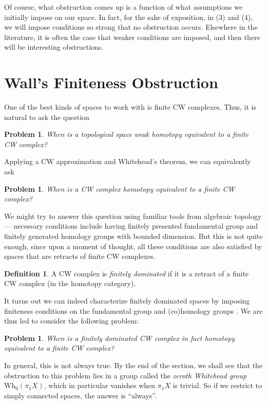 \documentclass[a4paper, 12pt]{article}
\newtheorem{problem}[thm]{Problem}
\theoremstyle{definition}
\newtheorem{defi}[thm]{Definition}
\newcommand\Wh{\mathrm{Wh}}
\begin{document}
Of course, what obstruction comes up is a function of what assumptions we initially impose on our space. In fact, for the sake of exposition, in (3) and (4), we will impose conditions so strong that no obstruction occurs. Elsewhere in the literature, it is often the case that weaker conditions are imposed, and then there will be interesting obstructions.

\section{Wall's Finiteness Obstruction}
One of the best kinds of spaces to work with is finite CW complexes. Thus, it is natural to ask the question
\begin{problem}
  When is a topological space weak homotopy equivalent to a finite CW complex?
\end{problem}
Applying a CW approximation and  Whitehead's theorem, we can equivalently ask
\begin{problem}
  When is a CW complex homotopy equivalent to a finite CW complex?
\end{problem}

We might try to answer this question using familiar tools from algebraic topology --- necessary conditions include having finitely presented fundamental group and finitely generated homology groups with bounded dimension. But this is not quite enough, since upon a moment of thought, all these conditions are also satisfied by spaces that are retracts of finite CW complexes.

\begin{defi}
  A CW complex is \emph{finitely dominated} if it is a retract of a finite CW complex (in the homotopy category).
\end{defi}
It turns out we can indeed characterize finitely dominated spaces by imposing finiteness conditions on the fundamental group and (co)homology groups \cite[Lecture 1, Proposition 22]{lurie-281}. We are thus led to consider the following problem:

\begin{problem}
  When is a finitely dominated CW complex in fact homotopy equivalent to a finite CW complex?
\end{problem}
In general, this is not always true. By the end of the section, we shall see that the obstruction to this problem lies in a group called the \emph{zeroth Whitehead group} $\Wh_0(\pi_1 X)$, which in particular vanishes when $\pi_1X$ is trivial. So if we restrict to simply connected spaces, the answer is ``always''.
\end{document}
